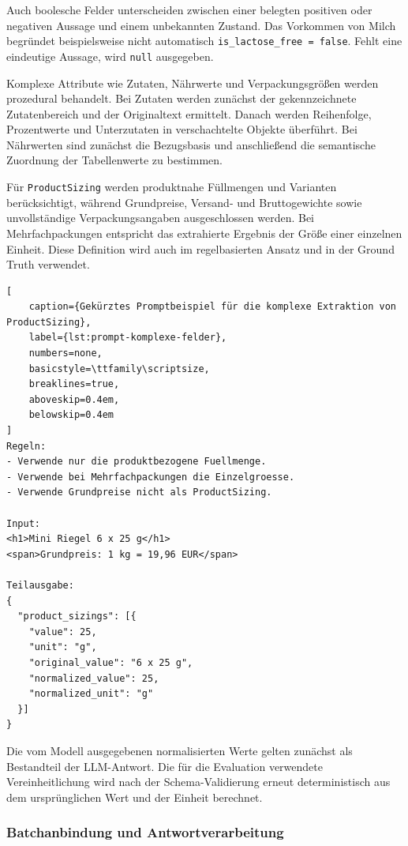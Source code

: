 Auch boolesche Felder unterscheiden zwischen einer belegten positiven oder negativen Aussage und einem unbekannten Zustand. Das Vorkommen von Milch begründet 
beispielsweise nicht automatisch \texttt{is\_lactose\_free = false}. Fehlt eine eindeutige Aussage, wird \texttt{null} ausgegeben.

Komplexe Attribute wie Zutaten, Nährwerte und Verpackungsgrößen werden prozedural behandelt. Bei Zutaten werden zunächst der gekennzeichnete Zutatenbereich und der 
Originaltext ermittelt. Danach werden Reihenfolge, Prozentwerte und Unterzutaten in verschachtelte Objekte überführt. Bei Nährwerten sind zunächst die Bezugsbasis und 
anschließend die semantische Zuordnung der Tabellenwerte zu bestimmen.

Für \texttt{ProductSizing} werden produktnahe Füllmengen und Varianten berücksichtigt, während Grundpreise, Versand- und Bruttogewichte sowie unvollständige 
Verpackungsangaben ausgeschlossen werden. Bei Mehrfachpackungen entspricht das extrahierte Ergebnis der Größe einer einzelnen Einheit. Diese Definition wird auch im 
regelbasierten Ansatz und in der Ground Truth verwendet.

\begin{lstlisting}[
    caption={Gekürztes Promptbeispiel für die komplexe Extraktion von ProductSizing},
    label={lst:prompt-komplexe-felder},
    numbers=none,
    basicstyle=\ttfamily\scriptsize,
    breaklines=true,
    aboveskip=0.4em,
    belowskip=0.4em
]
Regeln:
- Verwende nur die produktbezogene Fuellmenge.
- Verwende bei Mehrfachpackungen die Einzelgroesse.
- Verwende Grundpreise nicht als ProductSizing.

Input:
<h1>Mini Riegel 6 x 25 g</h1>
<span>Grundpreis: 1 kg = 19,96 EUR</span>

Teilausgabe:
{
  "product_sizings": [{
    "value": 25,
    "unit": "g",
    "original_value": "6 x 25 g",
    "normalized_value": 25,
    "normalized_unit": "g"
  }]
}
\end{lstlisting}

Die vom Modell ausgegebenen normalisierten Werte gelten zunächst als Bestandteil der LLM-Antwort. Die für die Evaluation verwendete Vereinheitlichung wird nach der 
Schema-Validierung erneut deterministisch aus dem ursprünglichen Wert und der Einheit berechnet.

\subsubsection{Batchanbindung und Antwortverarbeitung}

